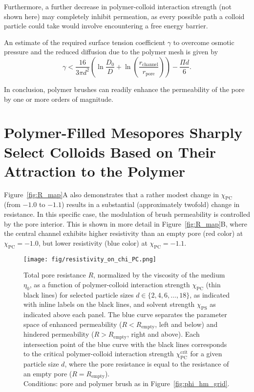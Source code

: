 \documentclass[12pt, a4paper]{article}
\begin{document}
Furthermore, a further decrease in polymer-colloid interaction strength (not shown here) may completely inhibit permeation, as every possible path a colloid particle could take would involve encountering a free energy barrier.

An estimate of the required surface tension coefficient $\gamma$ to overcome osmotic pressure and the reduced diffusion due to the polymer mesh is given by
\begin{equation}
\gamma < \frac{16}{3 \pi d^2} \left( \ln\frac{D_0}{D} + \ln\left( \frac{r_{\textrm{channel}}}{r_{\textrm{pore}}} \right) \right) - \frac{\Pi d}{6}.
\end{equation}

In conclusion, polymer brushes can readily enhance the permeability of the pore by one or more orders of magnitude.

\section{Polymer-Filled Mesopores Sharply Select Colloids Based on Their Attraction to the Polymer}

Figure~\ref{fig:R_map}A also demonstrates that a rather modest change in $\chi_{\textrm{PC}}$ (from $-1.0$ to $-1.1$) results in a substantial (approximately twofold) change in resistance.
In this specific case, the modulation of brush permeability is controlled by the pore interior.
This is shown in more detail in Figure~\ref{fig:R_map}B, where the central channel exhibits higher resistivity than an empty pore (red color) at $\chi_{\textrm{PC}} = -1.0$, but lower resistivity (blue color) at $\chi_{\textrm{PC}} = -1.1$.

\begin{figure}
    \centering
    \texttt{[image: fig/resistivity\_on\_chi\_PC.png]}
    \caption{
        Total pore resistance $R$, normalized by the viscosity of the medium $\eta_0$, as a function of polymer-colloid interaction strength $\chi_{\textrm{PC}}$ (thin black lines) for selected particle sizes $d \in \{2, 4, 6, \dots, 18\}$, as indicated with inline labels on the black lines, and solvent strength $\chi_{\textrm{PS}}$ as indicated above each panel.
        The blue curve separates the parameter space of enhanced permeability ($R < R_{\textrm{empty}}$, left and below) and hindered permeability ($R > R_{\textrm{empty}}$, right and above).
        Each intersection point of the blue curve with the black lines corresponds to the critical polymer-colloid interaction strength $\chi_{\textrm{PC}}^{\textrm{crit}}$ for a given particle size $d$, where the pore resistance is equal to the resistance of an empty pore ($R = R_{\textrm{empty}}$).
        \\
        Conditions: pore and polymer brush as in Figure~\ref{fig:phi_hm_grid}.
    }
    \label{fig:R_vs_chi_PC}
\end{figure}
\end{document}
